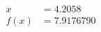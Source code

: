 \documentclass[preview]{standalone}
\begin{document}
\begin{align*}
x &= 4.2058\\f(x) &= 7.9176790
\end{align*}
\end{document}
